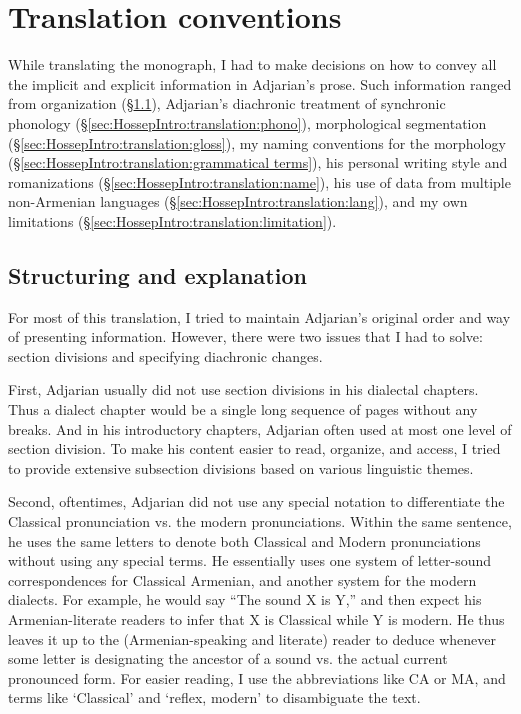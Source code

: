  

\section{Translation conventions}\label{sec:HossepIntro:translation}
While translating the monograph, I had to make decisions on how to convey all the implicit and explicit information in Adjarian's prose. Such information ranged from organization (\S\ref{sec:HossepIntro:translation:exp}),  Adjarian's diachronic treatment of synchronic phonology  (\S\ref{sec:HossepIntro:translation:phono}),   morphological segmentation (\S\ref{sec:HossepIntro:translation:gloss}), my naming conventions for the morphology (\S\ref{sec:HossepIntro:translation:grammatical terms}),  his personal writing style and romanizations (\S\ref{sec:HossepIntro:translation:name}),  his use of data from multiple non-Armenian languages (\S\ref{sec:HossepIntro:translation:lang}), and my own limitations (\S\ref{sec:HossepIntro:translation:limitation}).
\subsection{Structuring and explanation}\label{sec:HossepIntro:translation:exp}
For most of this translation, I tried to maintain Adjarian's original order and way of presenting information. However, there were two issues that I had to solve: section divisions and specifying diachronic changes. 


First, Adjarian usually did not use section divisions in his dialectal chapters. Thus a dialect chapter would be a single long sequence of pages without any breaks. And in his introductory chapters, Adjarian often used at most one level of section division. To make his content easier to read, organize, and access, I tried to provide extensive subsection divisions based on various linguistic themes. 

Second,  oftentimes, Adjarian did not use any special notation to differentiate the Classical pronunciation vs. the modern pronunciations.  Within the same sentence, he uses the same letters to denote both Classical and Modern pronunciations without using any special terms.  He essentially uses one system of letter-sound correspondences for Classical Armenian, and another system for the modern dialects. For example, he would say  ``The sound X is Y,'' and then expect his Armenian-literate readers to  infer that X is Classical while Y is modern. He thus leaves it up to the (Armenian-speaking and literate) reader to deduce whenever some letter is designating the ancestor of a sound vs. the actual current pronounced form. For easier reading, I use the abbreviations like CA or MA, and terms like `Classical' and `reflex, modern' to disambiguate the text.   

